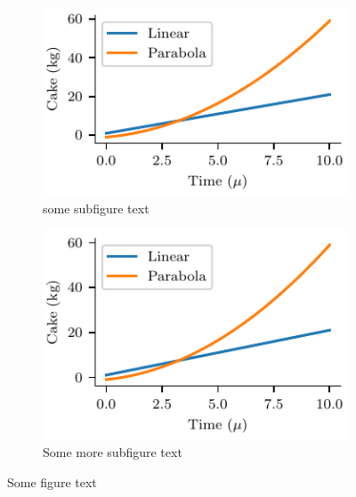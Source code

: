 \documentclass[a4paper,11pt]{report} %
\numberwithin{equation}{section}
\begin{document}
\begin{figure}
	\centering
	\begin{subfigure}{0.49\textwidth}
		\centering
		\includegraphics[width=1\linewidth]{fig/TwoGolden.pdf}
		\caption{some subfigure text}
	\end{subfigure}
	\begin{subfigure}{0.49\textwidth}
		\centering
		\includegraphics[width=1\linewidth]{fig/TwoInnerGolden.pdf}
		\caption{Some more subfigure text}
	\end{subfigure}
	\caption{Some figure text}
\end{figure}
\end{document}
